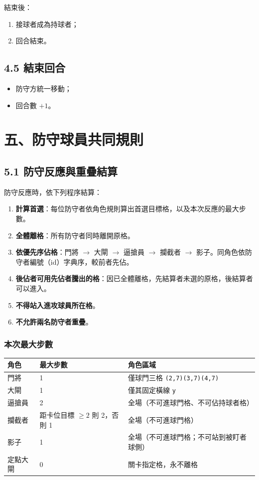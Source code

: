 \documentclass[11pt]{article}
\newcommand{\coord}[1]{\texttt{#1}}
\begin{document}
結束後：

\begin{enumerate}
  \item 接球者成為持球者；
  \item 回合結束。
\end{enumerate}

\subsection*{4.5 結束回合}

\begin{itemize}
  \item 防守方統一移動；
  \item 回合數 $+1$。
\end{itemize}

\section*{五、防守球員共同規則}

\subsection*{5.1 防守反應與重疊結算}

防守反應時，依下列程序結算：

\begin{enumerate}
  \item \textbf{計算首選}：每位防守者依角色規則算出首選目標格，以及本次反應的最大步數。
  \item \textbf{全體離格}：所有防守者同時離開原格。
  \item \textbf{依優先序佔格}：門將 $\rightarrow$ 大閘 $\rightarrow$ 逼搶員 $\rightarrow$ 攔截者 $\rightarrow$ 影子。同角色依防守者編號（id）字典序，較前者先佔。
  \item \textbf{後佔者可用先佔者騰出的格}：因已全體離格，先結算者未選的原格，後結算者可以進入。
  \item \textbf{不得站入進攻球員所在格}。
  \item \textbf{不允許兩名防守者重疊}。
\end{enumerate}

\subsubsection*{本次最大步數}

\vspace{0.3em}
\begin{tabular}{@{}lll@{}}
\toprule
\textbf{角色} & \textbf{最大步數} & \textbf{角色區域} \\
\midrule
門將 & 1 & 僅球門三格 \coord{(2,7)(3,7)(4,7)} \\
大閘 & 1 & 僅其固定橫線 \coord{y} \\
逼搶員 & 2 & 全場（不可進球門格、不可佔持球者格） \\
攔截者 & 距卡位目標 $\geq 2$ 則 2，否則 1 & 全場（不可進球門格） \\
影子 & 1 & 全場（不可進球門格；不可站到被盯者球側） \\
定點大閘 & 0 & 關卡指定格，永不離格 \\
\bottomrule
\end{tabular}
\end{document}
